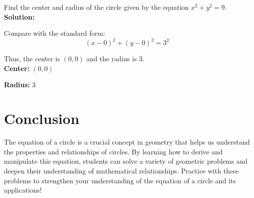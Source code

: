 \documentclass[12pt]{article}
\begin{document}
Find the center and radius of the circle given by the equation \( x^2 + y^2 = 9 \).\\

\textbf{Solution:}

Compare with the standard form:
\[
(x - 0)^2 + (y - 0)^2 = 3^2
\]

Thus, the center is \( (0, 0) \) and the radius is 3.\\

\textbf{Center:} \( (0, 0) \)

\textbf{Radius:} 3

\section*{Conclusion}

The equation of a circle is a crucial concept in geometry that helps us understand the properties and relationships of circles. By learning how to derive and manipulate this equation, students can solve a variety of geometric problems and deepen their understanding of mathematical relationships. Practice with these problems to strengthen your understanding of the equation of a circle and its applications!
\end{document}
